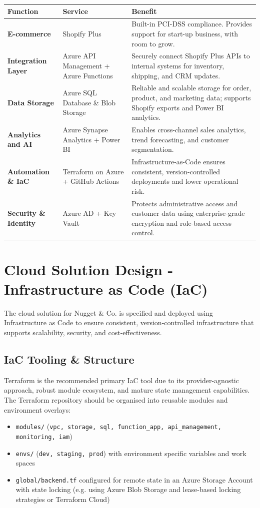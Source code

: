 \documentclass[12pt, a4paper, twoside]{article} %
\begin{document}
\begin{center}
\begin{tabularx}{1\textwidth}{
 | >{\raggedright\arraybackslash}X
 | >{\raggedright\arraybackslash}X
 | >{\raggedright\arraybackslash}X |
 }
\hline
\textbf{Function} & \textbf{Service} & \textbf{Benefit}\\
\hline \hline
\textbf{E-commerce} & Shopify Plus & Built-in PCI-DSS compliance. Provides support for start-up business, with room to grow.\\
\textbf{Integration Layer} & Azure API Management + Azure Functions & Securely connect Shopify Plus APIs to internal systems for inventory, shipping, and CRM updates.\\
\textbf{Data Storage} & Azure SQL Database \& Blob Storage & Reliable and scalable storage for order, product, and marketing data; supports Shopify exports and Power BI analytics.\\
\textbf{Analytics and AI} & Azure Synapse Analytics + Power BI & Enables cross-channel sales analytics, trend forecasting, and customer segmentation.\\
\textbf{Automation \& IaC} & Terraform on Azure + GitHub Actions & Infrastructure-as-Code ensures consistent, version-controlled deployments and lower operational risk.\\
\textbf{Security \& Identity} & Azure AD + Key Vault & Protects administrative access and customer data using enterprise-grade encryption and role-based access control.\\
\hline
\end{tabularx}
\end{center}


\section{Cloud Solution Design - Infrastructure as Code (IaC)}

The cloud solution for Nugget \& Co. is specified and deployed using Infrastructure as Code to ensure consistent, version-controlled infrastructure that supports scalability, security, and cost-effectiveness. 

\subsection{IaC Tooling \& Structure}
Terraform \citep{jayaram2024} is the recommended primary IaC tool due to its provider-agnostic approach, robust module ecosystem, and mature state management capabilities. The Terraform repository should be organised into reusable modules and environment overlays: 
\begin{itemize}
\item \texttt{modules/} (\texttt{vpc, storage, sql, function\_app, api\_management, monitoring, iam})
\item \texttt{envs/} (\texttt{dev, staging, prod}) with environment specific variables and work spaces
\item \texttt{global/backend.tf} configured for remote state in an Azure Storage Account with state locking (e.g. using Azure Blob Storage and lease-based locking strategies or Terraform Cloud)
\end{itemize}
\end{document}
